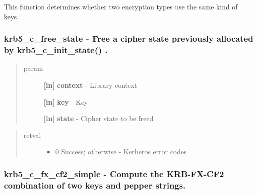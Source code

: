 \documentclass[letterpaper,10pt,english]{sphinxmanual}
\begin{document}
This function determines whether two encryption types use the same kind of keys.


\subsubsection{krb5\_c\_free\_state -  Free a cipher state previously allocated by krb5\_c\_init\_state() .}
\label{appdev/refs/api/krb5_c_free_state:krb5-c-free-state-free-a-cipher-state-previously-allocated-by-krb5-c-init-state}\label{appdev/refs/api/krb5_c_free_state::doc}

\begin{fulllineitems}
\label{appdev/refs/api/krb5_c_free_state:krb5_c_free_state}
\end{fulllineitems}

\begin{quote}\begin{description}
\item[{param}] \leavevmode
\textbf{{[}in{]}} \textbf{context} - Library context

\textbf{{[}in{]}} \textbf{key} - Key

\textbf{{[}in{]}} \textbf{state} - Cipher state to be freed

\end{description}\end{quote}
\begin{quote}\begin{description}
\item[{retval}] \leavevmode\begin{itemize}
\item {} 
0   Success; otherwise - Kerberos error codes

\end{itemize}

\end{description}\end{quote}


\subsubsection{krb5\_c\_fx\_cf2\_simple -  Compute the KRB-FX-CF2 combination of two keys and pepper strings.}
\label{appdev/refs/api/krb5_c_fx_cf2_simple:krb5-c-fx-cf2-simple-compute-the-krb-fx-cf2-combination-of-two-keys-and-pepper-strings}\label{appdev/refs/api/krb5_c_fx_cf2_simple::doc}
\end{document}

